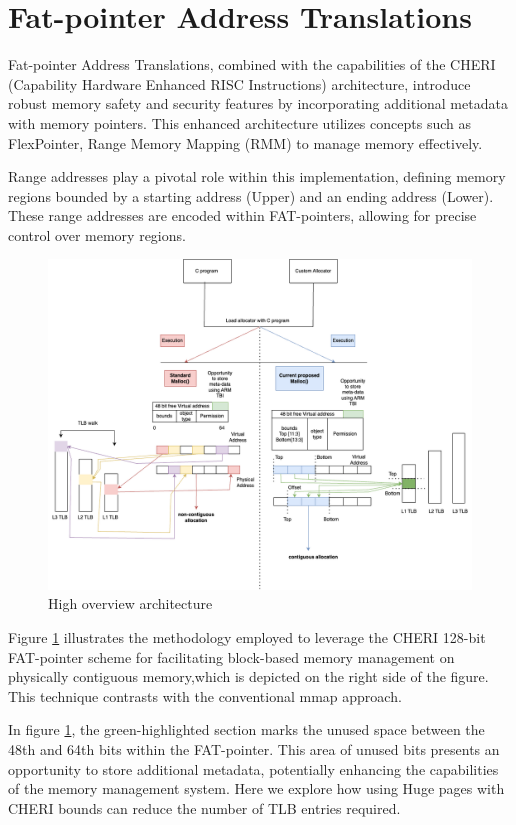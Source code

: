 \documentclass[11pt]{article}
\author{Akilan}
\date{\today}
\title{}
\begin{document}
\tableofcontents


\section{Fat-pointer Address Translations}
\label{sec:orgefab03e}

Fat-pointer Address Translations, combined with the capabilities of the CHERI (Capability Hardware Enhanced RISC Instructions) 
architecture, introduce robust memory safety and security features by incorporating additional metadata 
with memory pointers. This enhanced architecture utilizes concepts such as FlexPointer, 
Range Memory Mapping (RMM) to manage memory effectively.

Range addresses play a pivotal role within this implementation, defining memory 
regions bounded by a starting address (Upper) and an ending address (Lower). 
These range addresses are encoded within FAT-pointers, allowing for precise 
control over memory regions.

\begin{figure}[htbp]
\centering
\includegraphics[width=.9\linewidth]{diagram/HighOverviewArchitecture.drawio.png}
\caption{\label{fig:org26571f3}High overview architecture}
\end{figure}

Figure \ref{fig:org26571f3} illustrates
the methodology employed to leverage the CHERI 
128-bit FAT-pointer scheme for facilitating
block-based memory management on physically
contiguous memory,which is depicted on the
right side of the figure. 
This technique contrasts with the
conventional mmap approach.

In figure \ref{fig:org26571f3}, the green-highlighted
section marks the unused space between the 48th and 64th bits
within the FAT-pointer. This area of unused bits
presents an opportunity to store additional metadata,
potentially enhancing the capabilities of the
memory management system. 
Here we explore how using Huge pages
with CHERI bounds can reduce the
number of TLB entries required. 
\end{document}
